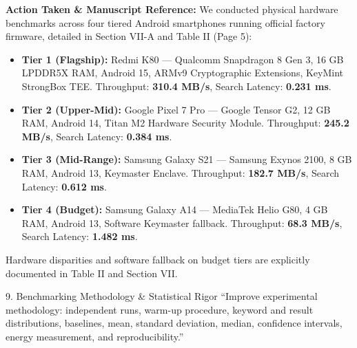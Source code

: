 \documentclass[11pt,a4paper]{article}
\begin{document}
\begin{responsebox}
\textbf{Action Taken \& Manuscript Reference:} We conducted physical hardware benchmarks across four tiered Android smartphones running official factory firmware, detailed in Section VII-A and Table II (Page 5):
\begin{itemize}[itemsep=2pt]
    \item \textbf{Tier 1 (Flagship):} Redmi K80 — Qualcomm Snapdragon 8 Gen 3, 16 GB LPDDR5X RAM, Android 15, ARMv9 Cryptographic Extensions, KeyMint StrongBox TEE. Throughput: \textbf{310.4 MB/s}, Search Latency: \textbf{0.231 ms}.
    \item \textbf{Tier 2 (Upper-Mid):} Google Pixel 7 Pro — Google Tensor G2, 12 GB RAM, Android 14, Titan M2 Hardware Security Module. Throughput: \textbf{245.2 MB/s}, Search Latency: \textbf{0.384 ms}.
    \item \textbf{Tier 3 (Mid-Range):} Samsung Galaxy S21 — Samsung Exynos 2100, 8 GB RAM, Android 13, Keymaster Enclave. Throughput: \textbf{182.7 MB/s}, Search Latency: \textbf{0.612 ms}.
    \item \textbf{Tier 4 (Budget):} Samsung Galaxy A14 — MediaTek Helio G80, 4 GB RAM, Android 13, Software Keymaster fallback. Throughput: \textbf{68.3 MB/s}, Search Latency: \textbf{1.482 ms}.
\end{itemize}
Hardware disparities and software fallback on budget tiers are explicitly documented in Table II and Section VII.
\end{responsebox}

\vspace{1em}

\begin{reviewbox}{9. Benchmarking Methodology \& Statistical Rigor}
``Improve experimental methodology: independent runs, warm-up procedure, keyword and result distributions, baselines, mean, standard deviation, median, confidence intervals, energy measurement, and reproducibility.''
\end{reviewbox}
\end{document}
